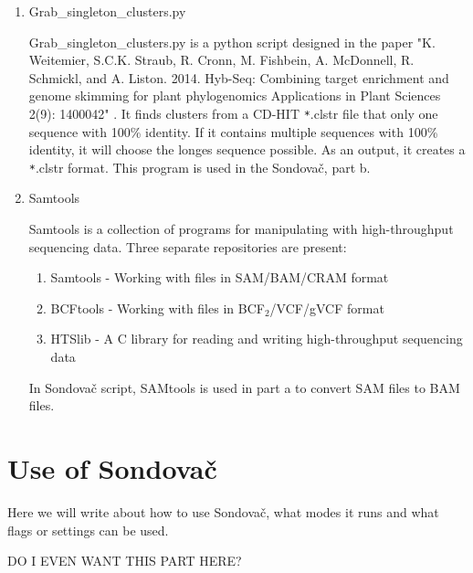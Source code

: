 \begin{enumerate}

\item Grab\_singleton\_clusters.py

Grab\_singleton\_clusters.py is a python script designed in the paper "K. Weitemier, S.C.K. Straub, R. Cronn, M. Fishbein, A. McDonnell, R. Schmickl, and A. Liston. 2014. Hyb-Seq: Combining target enrichment and genome skimming for plant phylogenomics Applications in Plant Sciences 2(9): 1400042" \cite{weitemier2014hyb}. It finds clusters from a CD-HIT \verb_*_.clstr file that only one sequence with 100\% identity. If it contains multiple sequences with 100\% identity, it will choose the longes sequence possible. As an output, it creates a \verb_*_.clstr format. 
\cite{grabsingletonclusters}
This program is used in the Sondovač, part b. 

\item Samtools

Samtools is a collection of programs for manipulating with high-throughput sequencing data. Three separate repositories are present: 
\begin{enumerate}
\item Samtools - Working with files in SAM/BAM/CRAM format
\item BCFtools - Working with files in BCF$_2$/VCF/gVCF format
\item HTSlib - A C library for reading and writing high-throughput sequencing data
\end{enumerate}
\cite{samtools}

In Sondovač script, SAMtools is used in part a to convert SAM files to BAM files. 







\end{enumerate}

\section{Use of Sondovač}
Here we will write about how to use Sondovač, what modes it runs and what flags or settings can be used.

DO I EVEN WANT THIS PART HERE? 



